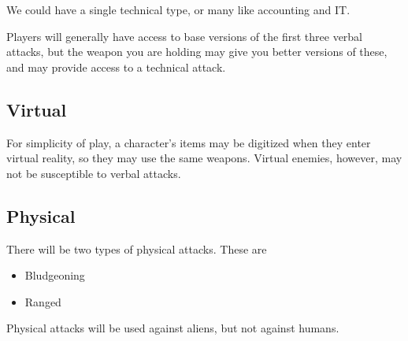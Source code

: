 \documentclass[12pt]{article}
\begin{document}
 We could have a single technical type, or many like accounting and IT. 
 
 Players will generally have access to base versions of the first three verbal
 attacks, but the weapon you are holding may give you better versions of these,
 and may provide access to a technical attack. 
  \subsection*{Virtual}
  For simplicity of play, a character's items may be digitized when they enter 
  virtual reality, so they may use the same weapons. Virtual enemies, however,
  may not be susceptible to verbal attacks. 
  
 \subsection*{Physical}
 There will be two types of physical attacks. These are 
 \begin{itemize}
 \item Bludgeoning 
 \item Ranged
 \end{itemize}
 Physical attacks will be used against aliens, but not against humans.
\end{document}

